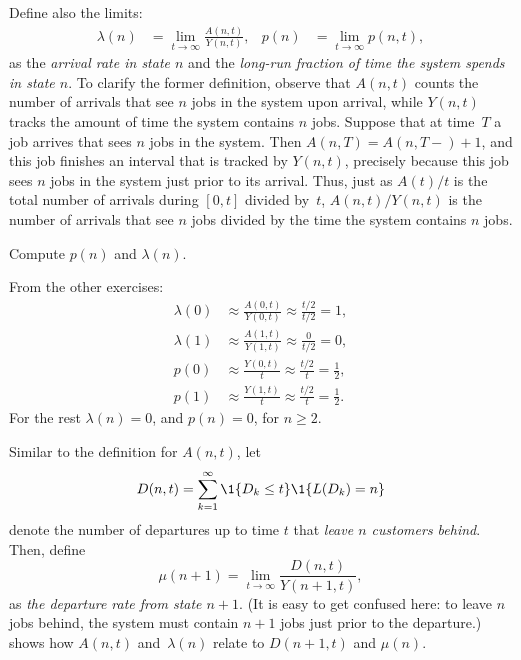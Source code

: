 Define also the limits:
\begin{align}\label{eq:p(n)}
 \lambda(n) &= \lim_{t\to\infty} \frac{A(n,t)}{Y(n,t)}, &p(n) &=\lim_{t\to\infty} p(n,t),
\end{align}
as the \emph{arrival rate in state $n$} and the \emph{long-run fraction of
 time the system spends in state $n$}. To clarify the former
definition, observe that $A(n,t)$ counts the number of arrivals that
see $n$ jobs in the system upon arrival, while $Y(n,t)$ tracks the amount of time
the system contains $n$ jobs. Suppose that at time~$T$ a job arrives that
sees $n$ jobs in the system. Then $A(n,T)=A(n, T-)+1$, and this job finishes
an interval that is tracked by $Y(n,t)$, precisely because this job
sees $n$ jobs in the system just prior to its arrival. Thus, just as
$A(t)/t$ is the total number of arrivals during $[0,t]$ divided by~$t$, $A(n,t)/Y(n,t)$ is the number of arrivals that see $n$ jobs divided by
the time the system contains $n$ jobs.

\begin{exercise}  
Compute $p(n)$ and $\lambda(n)$.
\begin{solution}
 From the other exercises:
 \begin{align*}
 \lambda(0) &\approx \frac{A(0,t)}{Y(0,t)} \approx \frac{t/2}{t/2} = 1, \\
 \lambda(1) &\approx \frac{A(1,t)}{Y(1,t)} \approx \frac{0}{t/2} = 0, \\
 p(0) &\approx \frac{Y(0,t)}{t} \approx \frac{t/2}{t} = \frac 1 2, \\
 p(1) &\approx \frac{Y(1,t)}{t} \approx \frac{t/2}{t} = \frac 1 2.
 \end{align*}
For the rest $\lambda(n) = 0$, and $p(n)=0$, for $n\geq 2$.
\end{solution}
\end{exercise}

Similar to the definition for $A(n,t)$, let
\begin{equation*}
 D(n,t) = \sum_{k=1}^\infty \1{D_k \leq t} \1{L(D_k) = n}
 \end{equation*}
 denote the number of departures up to time $t$ that\emph{ leave $n$
 customers behind}. Then, define
\begin{equation*}
 \mu(n+1) = \lim_{t\to\infty} \frac{D(n,t)}{Y(n+1,t)},
\end{equation*}
as \emph{ the departure rate from state $n+1$}.
(It is easy to get confused here: to leave $n$ jobs behind, the system must contain $n+1$ jobs just prior to the departure.)
 shows how $A(n,t)$ and~$\lambda(n)$ relate to $D(n+1,t)$ and $\mu(n)$.

